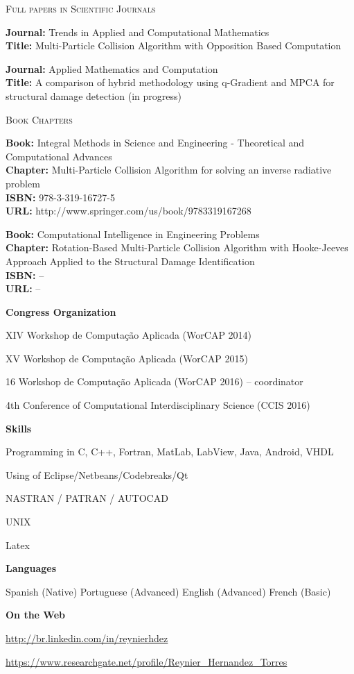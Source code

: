 \textsc{Full papers in Scientific Journals}

\textbf{Journal:} Trends in Applied and Computational Mathematics \\
\textbf{Title:} Multi-Particle Collision Algorithm with Opposition Based Computation

\textbf{Journal:} Applied Mathematics and Computation \\
\textbf{Title:} A comparison of hybrid methodology using q-Gradient and MPCA for structural damage detection (in progress)

\textsc{Book Chapters}

\textbf{Book:} Integral Methods in Science and Engineering - Theoretical and Computational Advances \\
\textbf{Chapter:} Multi-Particle Collision Algorithm for solving an inverse radiative problem \\
\textbf{ISBN:} 978-3-319-16727-5 \\
\textbf{URL:} http://www.springer.com/us/book/9783319167268

\textbf{Book:} Computational Intelligence in Engineering Problems \\
\textbf{Chapter:} Rotation-Based Multi-Particle Collision Algorithm with Hooke-Jeeves Approach Applied to the Structural Damage Identification \\
\textbf{ISBN:} -- \\
\textbf{URL:} --

\textbf{Congress Organization}

XIV Workshop de Computação Aplicada (WorCAP 2014)

XV Workshop de Computação Aplicada  (WorCAP 2015)

16 Workshop de Computação Aplicada (WorCAP 2016) – coordinator

4th Conference of Computational Interdisciplinary Science (CCIS 2016)

\textbf{Skills}

Programming in C, C++, Fortran, MatLab, LabView, Java, Android, VHDL

Using of Eclipse/Netbeans/Codebreaks/Qt

NASTRAN / PATRAN / AUTOCAD

UNIX

Latex

\textbf{Languages}

Spanish (Native)
Portuguese (Advanced)
English (Advanced)
French (Basic)

\textbf{On the Web}

\hspace{2em}\url{http://br.linkedin.com/in/reynierhdez}

\hspace{2em}\url{https://www.researchgate.net/profile/Reynier\_Hernandez\_Torres}
